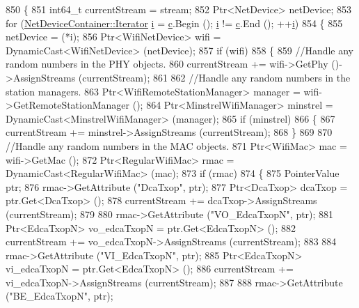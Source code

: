 \begin{DoxyCode}
850 \{
851   int64\_t currentStream = stream;
852   Ptr<NetDevice> netDevice;
853   \textcolor{keywordflow}{for} (\hyperlink{classns3_1_1NetDeviceContainer_a45709bb572f975569ed985fa89b132f8}{NetDeviceContainer::Iterator} \hyperlink{bernuolliDistribution_8m_a6f6ccfcf58b31cb6412107d9d5281426}{i} = \hyperlink{lte_2model_2fading-traces_2fading__trace__generator_8m_ae0323a9039add2978bf5b49550572c7c}{c}.Begin (); 
      \hyperlink{bernuolliDistribution_8m_a6f6ccfcf58b31cb6412107d9d5281426}{i} != \hyperlink{lte_2model_2fading-traces_2fading__trace__generator_8m_ae0323a9039add2978bf5b49550572c7c}{c}.End (); ++\hyperlink{bernuolliDistribution_8m_a6f6ccfcf58b31cb6412107d9d5281426}{i})
854     \{
855       netDevice = (*i);
856       Ptr<WifiNetDevice> wifi = DynamicCast<WifiNetDevice> (netDevice);
857       \textcolor{keywordflow}{if} (wifi)
858         \{
859           \textcolor{comment}{//Handle any random numbers in the PHY objects.}
860           currentStream += wifi->GetPhy ()->AssignStreams (currentStream);
861 
862           \textcolor{comment}{//Handle any random numbers in the station managers.}
863           Ptr<WifiRemoteStationManager> manager = wifi->GetRemoteStationManager ();
864           Ptr<MinstrelWifiManager> minstrel = DynamicCast<MinstrelWifiManager> (manager);
865           \textcolor{keywordflow}{if} (minstrel)
866             \{
867               currentStream += minstrel->AssignStreams (currentStream);
868             \}
869 
870           \textcolor{comment}{//Handle any random numbers in the MAC objects.}
871           Ptr<WifiMac> mac = wifi->GetMac ();
872           Ptr<RegularWifiMac> rmac = DynamicCast<RegularWifiMac> (mac);
873           \textcolor{keywordflow}{if} (rmac)
874             \{
875               PointerValue ptr;
876               rmac->GetAttribute (\textcolor{stringliteral}{"DcaTxop"}, ptr);
877               Ptr<DcaTxop> dcaTxop = ptr.Get<DcaTxop> ();
878               currentStream += dcaTxop->AssignStreams (currentStream);
879 
880               rmac->GetAttribute (\textcolor{stringliteral}{"VO\_EdcaTxopN"}, ptr);
881               Ptr<EdcaTxopN> vo\_edcaTxopN = ptr.Get<EdcaTxopN> ();
882               currentStream += vo\_edcaTxopN->AssignStreams (currentStream);
883 
884               rmac->GetAttribute (\textcolor{stringliteral}{"VI\_EdcaTxopN"}, ptr);
885               Ptr<EdcaTxopN> vi\_edcaTxopN = ptr.Get<EdcaTxopN> ();
886               currentStream += vi\_edcaTxopN->AssignStreams (currentStream);
887 
888               rmac->GetAttribute (\textcolor{stringliteral}{"BE\_EdcaTxopN"}, ptr);

\end{DoxyCode}
